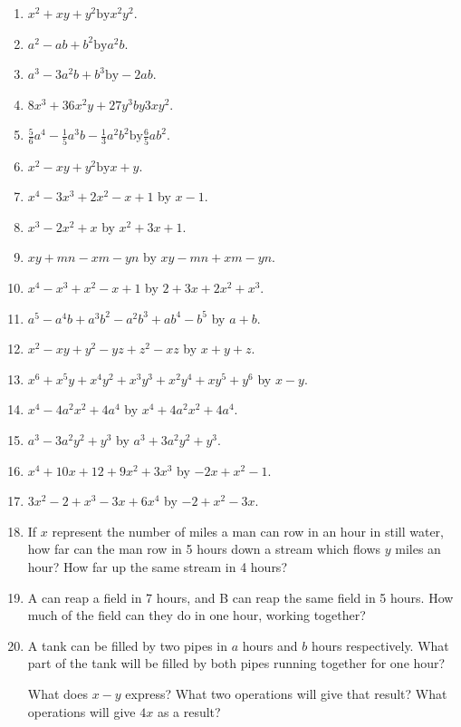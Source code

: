 \documentclass{book}
\begin{document}
\begin{enumerate}
\item $ x^2 + xy + y^2 \mbox{by} x^2y^2 $.

\item $ a^2 - ab + b^2 \mbox{by} a^2b $.

\item $ a^3 - 3a^2b + b^3 \mbox{by} -2ab $.

\item $ 8x^3 + 36x^2y + 27y^3 by 3xy^2 $.

\item $ \frac{5}{6}a^4 - \frac{1}{5}a^3b - \frac{1}{3}a^2b^2
\mbox{by} \frac{6}{5}ab^2 $.

\item $ x^2 - xy + y^2 \mbox{by} x + y $.

\item $x^4 - 3x^3 + 2x^2 - x + 1$ by $x-1$.

\item $x^3 - 2x^2 + x$ by $x^2 + 3x + 1$.

\item $xy + mn - xm - yn$ by $xy - mn + xm - yn$.

\item $x^4 - x^3 + x^2 - x + 1$ by $2 + 3x + 2x^2 + x^3$.

\item $a^5 - a^4b + a^3b^2 - a^2b^3 + ab^4 - b^5$ by $a + b$.

\item $x^2 - xy + y^2 - yz + z^2 - xz$ by $x + y + z$.

\item $x^6 + x^5y + x^4y^2 + x^3y^3 + x^2y^4 + xy^5 + y^6$ by $x -
y$.

\item $x^4 - 4a^2x^2 + 4a^4$ by $x^4 + 4a^2x^2 + 4a^4$.

\item $a^3 - 3a^2y^2 + y^3$ by $a^3 + 3a^2y^2 +y^3$.

\item $x^4 + 10x + 12 + 9x^2 + 3x^3$ by $-2x + x^2 - 1$.

\item $3x^2 - 2 + x^3 - 3x + 6x^4$ by $-2 + x^2 - 3x$.

\item If $x$ represent the number of miles a man can row in an
hour in still water, how far can the man row in 5 hours down a
stream which flows $y$ miles an hour? How far up the same stream
in 4 hours?

\item A can reap a field in 7 hours, and B can reap the same field
in 5 hours. How much of the field can they do in one hour, working
together?

\item A tank can be filled by two pipes in $a$ hours and $b$ hours
respectively. What part of the tank will be filled by both pipes
running together for one hour?

What does $x - y$ express? What two operations will
give that result? What operations will give $4x$ as a
result?
\end{enumerate}
\end{document}
